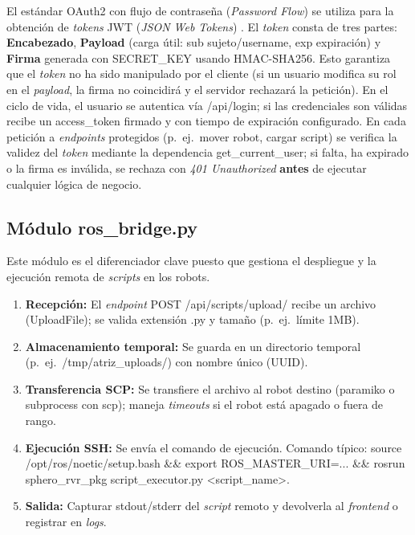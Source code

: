 \documentclass[12pt]{article}
\numberwithin{figure}{section}
\numberwithin{table}{section}
\def\code#1{#1}%
\def\file#1{#1}%
\newcommand{\code}[1]{\textcolor{codeblue}{\url{#1}}}
\newcommand{\file}[1]{\textcolor{darkblue}{\url{#1}}}
\begin{document}
El estándar OAuth2 con flujo de contraseña (\emph{Password Flow}) se utiliza para la obtención de \textit{tokens} JWT (\textit{JSON Web Tokens}) \cite{RFC7519_JWT}. El \textit{token} consta de tres partes: \textbf{Encabezado}, \textbf{Payload} (carga útil: \code{sub} sujeto/username, \code{exp} expiración) y \textbf{Firma} generada con \code{SECRET\_KEY} usando HMAC-SHA256. Esto garantiza que el \textit{token} no ha sido manipulado por el cliente (si un usuario modifica su rol en el \textit{payload}, la firma no coincidirá y el servidor rechazará la petición). En el ciclo de vida, el usuario se autentica vía \code{/api/login}; si las credenciales son válidas recibe un \code{access\_token} firmado y con tiempo de expiración configurado. En cada petición a \textit{endpoints} protegidos (p.\ ej.\ mover robot, cargar script) se verifica la validez del \textit{token} mediante la dependencia \code{get\_current\_user}; si falta, ha expirado o la firma es inválida, se rechaza con \textit{401 Unauthorized} \textbf{antes} de ejecutar cualquier lógica de negocio.


\subsection{Módulo ros\_bridge.py}

Este módulo es el diferenciador clave puesto que gestiona el despliegue y la ejecución remota de \textit{scripts} en los robots.

\begin{enumerate}
    \item \textbf{Recepción:} El \textit{endpoint} \code{POST /api/scripts/upload/} recibe un archivo (UploadFile); se valida extensión \code{.py} y tamaño (p.\ ej.\ límite 1MB).
    \item \textbf{Almacenamiento temporal:} Se guarda en un directorio temporal (p.\ ej.\ \file{/tmp/atriz\_uploads/}) con nombre único (UUID).
    \item \textbf{Transferencia SCP:} Se transfiere el archivo al robot destino (paramiko o \code{subprocess} con \code{scp}); maneja \textit{timeouts} si el robot está apagado o fuera de rango.
    \item \textbf{Ejecución SSH:} Se envía el comando de ejecución. Comando típico: \code{source /opt/ros/noetic/setup.bash \&\& export ROS\_MASTER\_URI=... \&\& rosrun sphero\_rvr\_pkg script\_executor.py <script\_name>}.
    \item \textbf{Salida:} Capturar stdout/stderr del \textit{script} remoto y devolverla al \textit{frontend} o registrar en \textit{logs}.
\end{enumerate}
\end{document}
